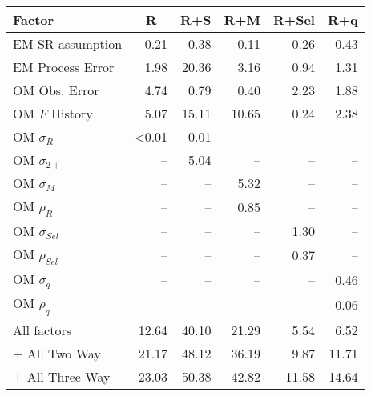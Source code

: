\begin{center}
\begin{tabular}{lrrrrr}
\hline\hline
\multicolumn{1}{l}{Factor}&\multicolumn{1}{c}{R}&\multicolumn{1}{c}{R+S}&\multicolumn{1}{c}{R+M}&\multicolumn{1}{c}{R+Sel}&\multicolumn{1}{c}{R+q}\tabularnewline
\hline
EM SR assumption& 0.21& 0.38& 0.11& 0.26& 0.43\tabularnewline
EM Process Error& 1.98&20.36& 3.16& 0.94& 1.31\tabularnewline
OM Obs. Error& 4.74& 0.79& 0.40& 2.23& 1.88\tabularnewline
OM $F$ History& 5.07&15.11&10.65& 0.24& 2.38\tabularnewline
OM $\sigma_R$&\textless  0.01& 0.01&--&--&--\tabularnewline
OM $\sigma_{2+}$ &--& 5.04&--&--&--\tabularnewline
OM $\sigma_M$&--&--& 5.32&--&--\tabularnewline
OM $\rho_R$&--&--& 0.85&--&--\tabularnewline
OM $\sigma_{Sel}$&--&--&--& 1.30&--\tabularnewline
OM $\rho_{Sel}$&--&--&--& 0.37&--\tabularnewline
OM $\sigma_q$&--&--&--&--& 0.46\tabularnewline
OM $\rho_q$&--&--&--&--& 0.06\tabularnewline
All factors&12.64&40.10&21.29& 5.54& 6.52\tabularnewline
+ All Two Way&21.17&48.12&36.19& 9.87&11.71\tabularnewline
+ All Three Way&23.03&50.38&42.82&11.58&14.64\tabularnewline
\hline
\end{tabular}\end{center}
